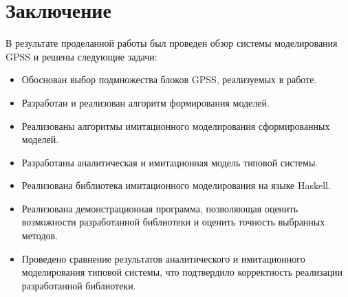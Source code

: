\chapter{Заключение}

В результате проделанной работы был проведен обзор системы моделирования GPSS и решены следующие задачи:

\begin{itemize}
\item Обоснован выбор подмножества блоков GPSS, реализуемых в работе.
\item Разработан и реализован алгоритм формирования моделей.
\item Реализованы алгоритмы имитационного моделирования сформированных моделей.
\item Разработаны аналитическая и имитационная модель типовой системы.
\item Реализована библиотека имитационного моделирования на языке Haskell.
\item Реализована демонстрационная программа, позволяющая оценить возможности разработанной библиотеки и оценить точность выбранных методов.
\item Проведено сравнение результатов аналитического и имитационного моделирования типовой системы, что подтвердило корректность реализации разработанной библиотеки.


\end{itemize}
